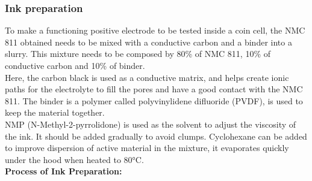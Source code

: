 \documentclass{article}
\begin{document}
\subsubsection{Ink preparation}
To make a functioning positive electrode to be tested inside a coin cell, 
the NMC 811 obtained needs to be mixed with a conductive carbon and a binder into a slurry.
This mixture needs to be composed by 80\% of NMC 811, 10\% of conductive carbon and 10\% of binder.\\
Here, the carbon black is used as a conductive matrix, and helps create ionic paths for the electrolyte 
to fill the pores and have a good contact with the NMC 811\cite{Itou}. The binder is a polymer called polyvinylidene difluoride (PVDF),
is used to keep the material together.\cite{PVDF} \cite{CB}\\
NMP (N-Methyl-2-pyrrolidone) is used as the solvent to adjust the viscosity of the ink. It should be added gradually to avoid clumps. Cyclohexane can be added to improve dispersion of active material in the mixture, it evaporates quickly under the hood when heated to 80°C.\\
\textbf{Process of Ink Preparation:}\\
\end{document}
